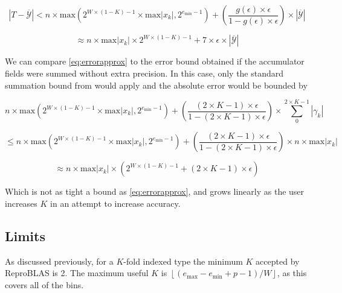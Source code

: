 \documentclass[12pt]{article}
\providecommand{\floor}[1]{\left \lfloor #1 \right \rfloor }
\providecommand{\min}{\ensuremath{\text{min}}}
\providecommand{\max}{\ensuremath{\text{max}}}
\theoremstyle{definition}
\numberwithin{equation}{section}
\numberwithin{figure}{section}
\begin{document}
    \begin{equation*}
      |T - \overline{\mathcal{Y}}| < n \times \max(2^{W \times (1 - K) - 1} \times \max|x_k|, 2^{e_{\min} - 1}) + (\frac{g(\epsilon)\times\epsilon}{1 - g(\epsilon)\times\epsilon}) \times |\overline{\mathcal{Y}}|
    \end{equation*}

    \begin{equation}
      \approx n \times \max|x_k|\times 2^{W \times (1 - K) - 1} + 7 \times \epsilon \times |\overline{\mathcal{Y}}|
      \label{eq:error2approx}
    \end{equation}

    We can compare  \eqref{eq:errorapprox} to the error bound obtained if the accumulator fields were summed without extra precision. In this case, only the standard summation bound from \cite{higham} would apply and the absolute error would be bounded by

    \begin{equation*}
    n \times \max(2^{W \times (1 - K) - 1} \times \max|x_k|, 2^{e_{\min} - 1}) + (\frac{(2 \times K - 1) \times \epsilon}{1 - (2 \times K - 1) \times \epsilon}) \times \sum\limits_0^{2 \times K - 1}|\gamma_k|
    \end{equation*}

    \begin{equation*}
    \leq n \times \max(2^{W \times (1 - K) - 1} \times \max|x_k|, 2^{e_{\min} - 1}) + (\frac{(2 \times K - 1) \times \epsilon}{1 - (2 \times K - 1) \times \epsilon}) \times n \times \max|x_k|
    \end{equation*}

    \begin{equation}
    \approx n \times \max|x_k|\times (2^{W \times (1 - K) - 1} + (2 \times K - 1) \times \epsilon)
    \label{eq:baderrorapprox}
    \end{equation}

    Which is not as tight a bound as \eqref{eq:errorapprox}, and grows linearly as the user increases $K$ in an attempt to increase accuracy.

  \subsection{Limits}
    \label{sec:primitiveops_limits}
    As discussed previously, for a $K$-fold indexed type the minimum $K$ accepted by ReproBLAS is 2. The maximum useful $K$ is $\floor{(e_{\max} - e_{\min} + p - 1)/W}$, as this covers all of the bins.
\end{document}
